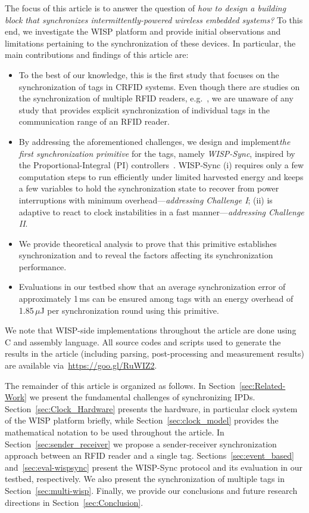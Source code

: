 \documentclass[journal,draftcls,onecolumn,12pt,twoside]{IEEEtranTCOM}
\begin{document}
The focus of this article is to answer the question of \emph{how to design a building block that synchronizes intermittently-powered wireless embedded systems?} To this end, we investigate the WISP platform and provide initial observations and limitations pertaining to the synchronization of these devices. In particular, the main contributions and findings of 
this article are:
%
\begin{itemize}
\item To the best of our knowledge, this is the first study that focuses on the synchronization of tags in CRFID systems. Even though there are studies on the synchronization of multiple RFID readers, e.g.~\cite{reader_sync}, we are unaware of any study that provides explicit synchronization of individual tags in the communication range of an RFID reader. 
\item By addressing the aforementioned challenges, we design and implement\emph{the first synchronization primitive} for the tags, namely \emph{WISP-Sync}, inspired by the Proportional-Integral (PI) controllers~\cite{pi2015}. WISP-Sync (i) 
requires only a few computation steps to run efficiently under limited harvested energy and keeps a few variables to hold the synchronization state to recover from power interruptions with minimum overhead---\emph{addressing Challenge I}; (ii) is adaptive to react to clock instabilities in a fast manner---\emph{addressing Challenge II}.
%
\item We provide theoretical analysis to prove that this primitive establishes synchronization and to reveal the factors affecting its synchronization performance.
%
\item Evaluations in our testbed show that an average synchronization error of approximately 1\,ms can be ensured among tags with an energy overhead of 1.85\,$\mu$J per synchronization round using this  primitive.
\end{itemize}
%
We note that WISP-side implementations throughout the article are done using C and assembly language. All source codes and scripts used to generate the results in the article (including parsing, post-processing and measurement results) are available via~\href{https://goo.gl/RuWIZ2}{https://goo.gl/RuWIZ2}.

The remainder of this article is organized as follows. In Section~\ref{sec:Related-Work} we present the fundamental challenges of synchronizing IPDs. Section~\ref{sec:Clock_Hardware} presents the hardware, in particular clock system of the WISP platform briefly, while Section~\ref{sec:clock_model} provides the mathematical notation to be used throughout the article. In 
Section~\ref{sec:sender_receiver} we propose a sender-receiver synchronization approach between an RFID reader and a single tag. Sections~\ref{sec:event_based} and~\ref{sec:eval-wispsync} present the WISP-Sync protocol and its evaluation in our testbed, respectively. We also present the synchronization of multiple tags in Section~\ref{sec:multi-wisp}. Finally, we provide our conclusions and future research directions in Section~\ref{sec:Conclusion}.  
\end{document}
